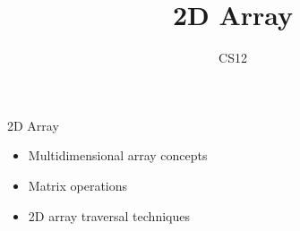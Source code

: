 \documentclass{beamer}
\title{2D Array}
\author{CS12}
\date{}
\begin{document}
\begin{frame}
    \titlepage
\end{frame}

\begin{frame}{2D Array}
    \begin{itemize}
        \item Multidimensional array concepts
        \item Matrix operations
        \item 2D array traversal techniques
    \end{itemize}
\end{frame}
\end{document}
